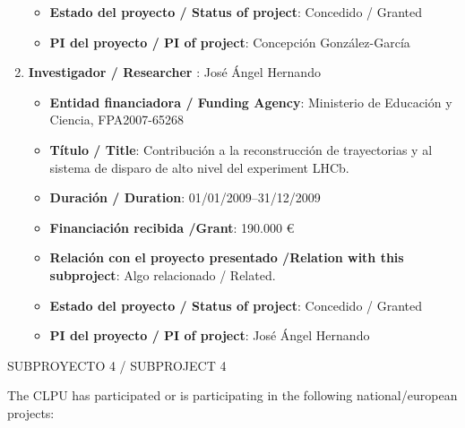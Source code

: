 \begin{enumerate}
\begin{itemize}
\item {\bf Estado del proyecto / Status of project}: Concedido / Granted
\item {\bf PI del proyecto / PI of project}: Concepción González-García 
\end{itemize}
\item {\bf Investigador / Researcher }: José Ángel Hernando
\begin{itemize}
\item {\bf Entidad financiadora / Funding Agency}: Ministerio de Educaci\'on y Ciencia, FPA2007-65268
\item {\bf Título / Title}:  Contribuci\'on a la reconstrucci\'on de trayectorias y al sistema de disparo de alto nivel del experiment LHCb.
\item {\bf Duración / Duration}: 01/01/2009--31/12/2009
\item {\bf Financiación recibida /Grant}: 190.000 \euro 
\item {\bf Relación con el proyecto presentado /Relation with this subproject}: Algo relacionado / Related. 
\item {\bf Estado del proyecto / Status of project}: Concedido / Granted
\item {\bf PI del proyecto / PI of project}: José Ángel Hernando
\end{itemize}
\end{enumerate}


{\sc SUBPROYECTO 4 / SUBPROJECT 4}

The CLPU has participated or is participating in the following national/european projects: 

